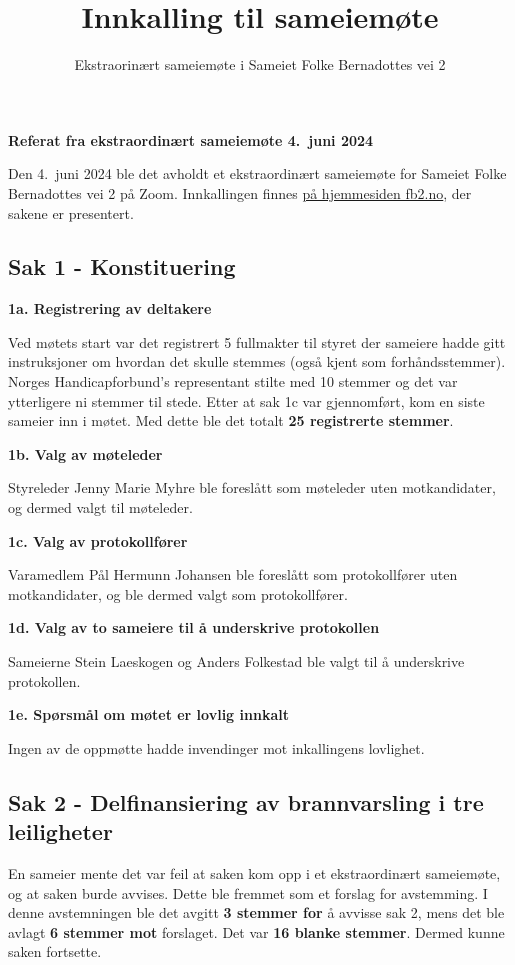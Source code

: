 \documentclass[12pt]{article}
\title{\LARGE\bf Innkalling til sameiemøte}
\author{Ekstraorinært sameiemøte i Sameiet Folke Bernadottes vei 2}
\date{}
\begin{document}
\begin{centering}
  {\Large\bf Referat fra ekstraordinært sameiemøte 4.\ juni 2024}
\end{centering}

\bigskip

Den 4.\ juni 2024 ble det avholdt et ekstraordinært sameiemøte for Sameiet Folke Bernadottes vei 2
på Zoom. Innkallingen finnes \href{http://fb2.no/arsmoter/2024-06-sameiemote/}{på hjemmesiden
  fb2.no}, der sakene er presentert.

\subsection*{Sak 1 - Konstituering}

{\bf 1a. Registrering av deltakere}

Ved møtets start var det registrert 5 fullmakter til styret der sameiere hadde gitt instruksjoner
om hvordan det skulle stemmes (også kjent som forhåndsstemmer). Norges Handicapforbund's
representant stilte med 10 stemmer og det var ytterligere ni stemmer til stede. Etter at sak 1c var
gjennomført, kom en siste sameier inn i møtet. Med dette ble det totalt {\bf 25 registrerte
  stemmer}.\smallskip

{\bf 1b. Valg av møteleder}

Styreleder Jenny Marie Myhre ble foreslått som møteleder uten motkandidater, og dermed valgt til
møteleder.\smallskip

{\bf 1c. Valg av protokollfører}

Varamedlem Pål Hermunn Johansen ble foreslått som protokollfører uten motkandidater, og ble dermed
valgt som protokollfører.\smallskip

{\bf 1d. Valg av to sameiere til å underskrive protokollen}

Sameierne Stein Laeskogen og Anders Folkestad ble valgt til å underskrive protokollen.

{\bf 1e. Spørsmål om møtet er lovlig innkalt}

Ingen av de oppmøtte hadde invendinger mot inkallingens lovlighet.

\subsection*{Sak 2 - Delfinansiering av brannvarsling i tre leiligheter}

En sameier mente det var feil at saken kom opp i et ekstraordinært sameiemøte, og at saken burde
avvises. Dette ble fremmet som et forslag for avstemming. I denne avstemningen ble det avgitt {\bf
  3 stemmer for} å avvisse sak 2, mens det ble avlagt {\bf 6 stemmer mot} forslaget. Det var {\bf
  16 blanke stemmer}. Dermed kunne saken fortsette.
\end{document}
